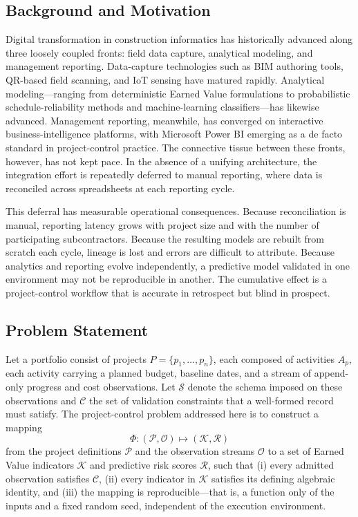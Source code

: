 \documentclass[conference]{IEEEtran}
\begin{document}
\subsection{Background and Motivation}

Digital transformation in construction informatics has historically advanced along three loosely coupled fronts: field data capture, analytical modeling, and management reporting. Data-capture technologies such as BIM authoring tools, QR-based field scanning, and IoT sensing have matured rapidly. Analytical modeling---ranging from deterministic Earned Value formulations to probabilistic schedule-reliability methods and machine-learning classifiers---has likewise advanced. Management reporting, meanwhile, has converged on interactive business-intelligence platforms, with Microsoft Power BI emerging as a de facto standard in project-control practice. The connective tissue between these fronts, however, has not kept pace. In the absence of a unifying architecture, the integration effort is repeatedly deferred to manual reporting, where data is reconciled across spreadsheets at each reporting cycle.

This deferral has measurable operational consequences. Because reconciliation is manual, reporting latency grows with project size and with the number of participating subcontractors. Because the resulting models are rebuilt from scratch each cycle, lineage is lost and errors are difficult to attribute. Because analytics and reporting evolve independently, a predictive model validated in one environment may not be reproducible in another. The cumulative effect is a project-control workflow that is accurate in retrospect but blind in prospect.

\subsection{Problem Statement}

Let a portfolio consist of projects $P = \{p_1, \dots, p_n\}$, each composed of activities $A_{p}$, each activity carrying a planned budget, baseline dates, and a stream of append-only progress and cost observations. Let $\mathcal{S}$ denote the schema imposed on these observations and $\mathcal{C}$ the set of validation constraints that a well-formed record must satisfy. The project-control problem addressed here is to construct a mapping
\begin{equation}
\Phi : (\mathcal{P}, \mathcal{O}) \longmapsto (\mathcal{K}, \mathcal{R})
\end{equation}
from the project definitions $\mathcal{P}$ and the observation streams $\mathcal{O}$ to a set of Earned Value indicators $\mathcal{K}$ and predictive risk scores $\mathcal{R}$, such that (i) every admitted observation satisfies $\mathcal{C}$, (ii) every indicator in $\mathcal{K}$ satisfies its defining algebraic identity, and (iii) the mapping is reproducible---that is, a function only of the inputs and a fixed random seed, independent of the execution environment.
\end{document}
